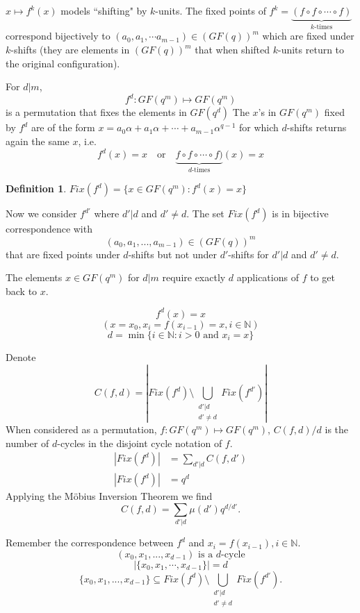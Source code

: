 \documentclass[11pt]{amsart}
\newtheorem{definition}{{\bf Definition}}
\begin{document}
$x\mapsto f^k(x)$ models ``shifting" by $k$-units. The fixed points of $f^k= \underbrace{(f\circ f\circ \cdots \circ f)}_{k\mbox{-times}}$ correspond bijectively to $(a_0,a_1,\cdots a_{m-1})\in (GF(q))^m$ which are fixed under $k$-shifts (they are elements in $(GF(q))^m$ that when shifted $k$-units return to the original configuration).

For $d|m$, $$ f^d: GF(q^m)\mapsto GF(q^m)$$ is a permutation that fixes the elements in $GF(q^d)$ The $x$'s in $GF(q^m)$ fixed by $f^d$ are of the form $x = a_0\alpha+a_1\alpha+\cdots + a_{m-1}\alpha^{q-1}$ for which $d$-shifts returns again the same $x$, i.e.
$$ f^d(x) = x \quad \mbox{or}\quad \underbrace{f\circ f\circ \cdots \circ f)}_{d\mbox{-times}}(x) = x$$

\begin{definition}
$\displaystyle{Fix(f^d) = \lbrace x \in GF(q^m) : f^d(x) = x \rbrace }$
\end{definition}

 Now we consider $f^{d'}$ where $d'|d$ and $d' \neq d$. The set $Fix(f^d)$ is in bijective correspondence with $$(a_0, a_1, ..., a_{m-1})\in (GF(q))^m$$ that are fixed points under $d$-shifts but not under $d'$-shifts for $d'|d$ and $d'\neq d$.

 The elements $x\in GF(q^m)$ for $d|m$ require exactly $d$ applications of $f$ to get back to $x$.

$$f^d(x) = x$$
$$(x=x_0, x_i = f(x_{i-1})=x, i \in \mathbb{N})$$
$$d = \min \lbrace i \in \mathbb{N}: i> 0 \mbox{ and } x_i = x\rbrace$$

 Denote $$\displaystyle{ C(f,d) = \left| Fix(f^d)\setminus \bigcup_{\substack{d'|d\\d'\neq d}} Fix (f^{d'})\right|}$$
 When considered as a permutation, $f: GF(q^m)\mapsto GF(q^m)$, $C(f,d)/d$ is the number of $d$-cycles in the disjoint cycle notation of $f$.
\begin{align*}
|Fix(f^d)| &= \sum_{d'|d} C(f,d')\\
|Fix(f^d)|&= q^d
\end{align*}
Applying the M\"{o}bius Inversion Theorem we find
$$ C(f,d) = \sum_{d'|d}\mu (d')q^{d/d'}.$$

Remember the correspondence between $f^d$ and $x_i = f(x_{i-1}), i\in \mathbb{N}$.
$$ (x_0,x_1,... , x_{d-1})\mbox{ is a $d$-cycle}$$
$$ |\lbrace x_0, x_1,\cdots, x_{d-1}\rbrace|=d$$
$$\lbrace x_0, x_1,..., x_{d-1}\rbrace \subseteq Fix(f^d) \setminus \bigcup_{\substack{d'|d\\d'\neq d}} Fix(f^{d'}).$$
\end{document}
